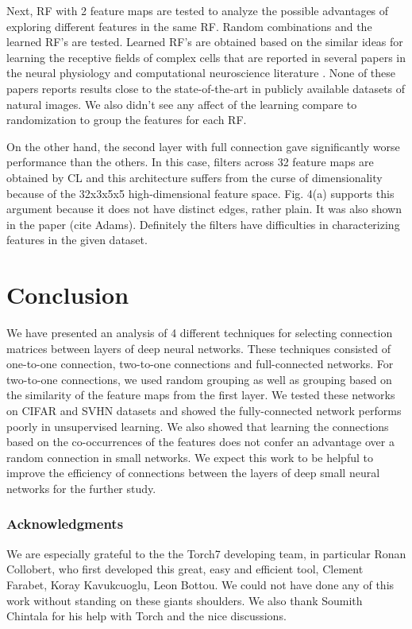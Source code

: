 \documentclass{article} %
\begin{document}
Next, RF with 2 feature maps are tested to analyze the possible advantages of exploring different features in the same RF.
Random combinations and the learned RF's are tested.
Learned RF's are obtained  based on the similar ideas for learning the receptive fields of complex cells that are reported in 
several papers in the neural physiology and computational neuroscience literature \cite{masquelier2007learning,spratling2005learning,wiskott2002slow,wallis1997invariant}.
None of these papers reports results close to the state-of-the-art in publicly available datasets of natural images.
We also didn't see any affect of the learning compare to randomization to group the features for each RF.

On the other hand, the second layer with full connection gave significantly worse performance than the others.
In this case, filters across 32 feature maps are obtained by CL and this architecture suffers from the curse of dimensionality
because of the 32x3x5x5 high-dimensional feature space.
Fig. 4(a) supports this argument because it does not have distinct edges, rather plain.
It was also shown in the paper (cite Adams).
Definitely the filters have difficulties in characterizing features in the given dataset.

\section{Conclusion}
\label{sec-conc}

We have presented an analysis of 4 different techniques for selecting connection matrices between layers of deep neural networks.
These techniques consisted of one-to-one connection, two-to-one connections and full-connected networks.
For two-to-one connections, we used random grouping as well as grouping based on the similarity of the feature maps from the first layer. 
We tested these networks on CIFAR and SVHN datasets and showed the fully-connected network performs poorly in unsupervised learning.
We also showed that learning the connections based on the co-occurrences of  the features does not confer an advantage over a random connection in small networks.
We expect this work to be helpful to improve the efficiency of connections between the layers of deep small neural networks for the further study.


\subsubsection*{Acknowledgments}
We are especially grateful to the the Torch7 developing team, in particular Ronan Collobert, who first developed this great, easy and efficient tool,
Clement Farabet, Koray Kavukcuoglu, Leon Bottou.
We could not have done any of this work without standing on these giants shoulders.
We also thank Soumith Chintala for his help with Torch and the nice discussions.



\end{document}
